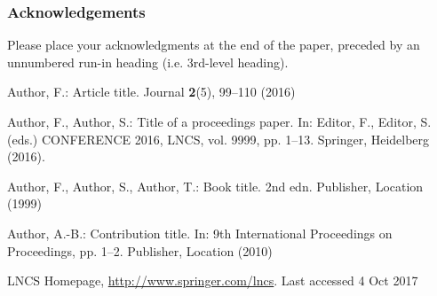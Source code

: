 \documentclass[runningheads]{llncs}
\begin{document}
\subsubsection{Acknowledgements} Please place your acknowledgments at
the end of the paper, preceded by an unnumbered run-in heading (i.e.
3rd-level heading).

%
%
%
% 
% 
%
\begin{thebibliography}{8}
Author, F.: Article title. Journal \textbf{2}(5), 99--110 (2016)

Author, F., Author, S.: Title of a proceedings paper. In: Editor,
F., Editor, S. (eds.) CONFERENCE 2016, LNCS, vol. 9999, pp. 1--13.
Springer, Heidelberg (2016). 

Author, F., Author, S., Author, T.: Book title. 2nd edn. Publisher,
Location (1999)

Author, A.-B.: Contribution title. In: 9th International Proceedings
on Proceedings, pp. 1--2. Publisher, Location (2010)

LNCS Homepage, \url{http://www.springer.com/lncs}. Last accessed 4
Oct 2017
\end{thebibliography}
\end{document}
